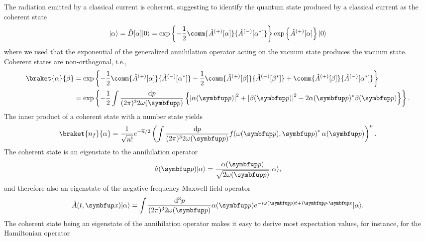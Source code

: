 The radiation emitted by a classical current is coherent, suggesting to identify the quantum state produced by a classical current as the coherent state
\begin{equation}
	\ket{\alpha}
	=
	\hat{D}[\alpha]
	\vacket
	=
	\exp\left\{
		-
		\frac{1}{2}
		\comm{\hat{A}^{(+)}[\alpha]}{\hat{A}^{(-)}[\alpha^*]}
	\right\}
	\exp\left\{
		\hat{A}^{(+)}[\alpha]
	\right\}
	\vacket
	\label{eq:coherent_state}
\end{equation}
where we used that the exponential of the generalized annihilation operator acting on the vacuum state produces the vacuum state.
Coherent states are non-orthogonal, i.e.,
\begin{equation}
	\begin{split}
		\braket{\alpha}{\beta}
		&=
		\exp\left\{
			-
			\frac{1}{2}
			\comm{\hat{A}^{(+)}[\alpha]}{\hat{A}^{(-)}[\alpha^*]}
			-
			\frac{1}{2}
			\comm{\hat{A}^{(+)}[\beta]}{\hat{A}^{(-)}[\beta^*]}
			+
			\comm{\hat{A}^{(+)}[\beta]}{\hat{A}^{(-)}[\alpha^*]}
		\right\}
		\\
		&=
		\exp\left\{
			-
			\frac{1}{2}
			\int\frac{\dd{p}}{(2\pi)^32\omega(\vb{p})}
			\left\{
				\abs*{\alpha(\vb{p})}^2
				+
				\abs*{\beta(\vb{p})}^2
				-
				2\alpha(\vb{p})^*\beta(\vb{p})
			\right\}
		\right\}
		\label{eq:coherent_state_inner}
		.
	\end{split}
\end{equation}
The inner product of a coherent state with a number state yields
\begin{equation}
	\braket{n_f}{\alpha}
	=
	\frac{1}{\sqrt{n!}}
	e^{-\overline{n}/2}
	\left(
		\int\frac{\dd{p}}{(2\pi)^32\omega(\vb{p})}
		f\!\left(\omega(\vb{p}),\vb{p}\right)^*
		\alpha(\vb{p})
	\right)^n
	\label{eq:coherent_state_inner_number}
	.
\end{equation}
The coherent state is an eigenstate to the annihilation operator
\begin{equation}
	\hat{a}(\vb{p})
	\ket{\alpha}
	=
	\frac{\alpha(\vb{p})}{\sqrt{2\omega(\vb{p})}}
	\ket{\alpha}
	\label{eq:coherent_state_annihilation}
	,
\end{equation}
and therefore also an eigenstate of the negative-frequency Maxwell field operator
\begin{equation}
	\hat{A}(t,\vb{x})
	\ket{\alpha}
	=
	\int\frac{\dd[3]{p}}{(2\pi)^32\omega(\vb{p})}
	\alpha(\vb{p})
	e^{-i\omega(\vb{p})t+i\vb{p}\vdot\vb{x}}
	\ket{\alpha}
	\label{eq:coherent_state_eigenstate_maxwell}
	.
\end{equation}
The coherent state being an eigenstate of the annihilation operator makes it easy to derive most expectation values, for instance, for the Hamiltonian operator
